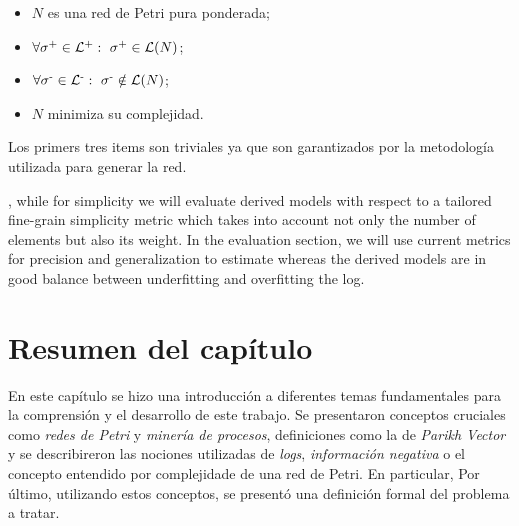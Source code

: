 \begin{itemize}
 \item $N$ es una red de Petri pura ponderada;
 \item $\forall \sigma\textsuperscript{+} \in {\mathcal L}\textsuperscript{+}:~ \sigma\textsuperscript{+} \in \mathcal{L}(N)$;
 \item $\forall \sigma\textsuperscript{-} \in {\mathcal L}\textsuperscript{-}:~ \sigma\textsuperscript{-} \notin \mathcal{L}(N)$;
 \item $N$ minimiza su complejidad. 
\end{itemize}

Los primers tres items son triviales ya que son garantizados por la metodología utilizada
para generar la red.

, while for simplicity we will evaluate derived models with respect to a tailored fine-grain simplicity metric
which takes into account not only the number of elements but also its weight. In the evaluation section, we will use current metrics for precision and
generalization to estimate whereas the derived models are in good balance between underfitting and overfitting the log.

\section{Resumen del capítulo}
\label{sec:2.resumen}
En este capítulo se hizo una introducción a diferentes temas fundamentales para la comprensión y el desarrollo de este trabajo. 
Se presentaron conceptos cruciales como \textit{redes de Petri} y \textit{minería de procesos}, definiciones como la
de \textit{Parikh Vector} y se describireron las nociones utilizadas de \textit{logs}, \textit{información negativa} o el concepto 
entendido por complejidade de una red de Petri.
En particular, 
Por último, utilizando estos conceptos, se presentó una definición formal del problema a tratar.
